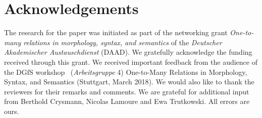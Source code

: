 \documentclass[output=paper]{langsci/langscibook}
\begin{document}
\section*{Acknowledgements}

The research for the paper was initiated as part of the networking grant \emph{One-to-many relations in morphology, syntax, and semantics} of the \textit{Deu\-tscher Akade\-mi\-scher Austauschdienst} (DAAD).
We gratefully acknowledge the funding received through this grant. We received important feedback from the audience of the DGfS workshop  (\textit{Arbeitsgruppe} 4) One-to-Many Relations in Morphology, Syntax, and Semantics (Stuttgart, March 2018). 
We would also like to thank the reviewers for their remarks and comments.
We are grateful for additional input from Berthold Crysmann, Nicolas Lamoure and Ewa Trutkowski.
All errors are ours.

{\sloppy\printbibliography[heading=subbibliography,notkeyword=this]}
\end{document}
